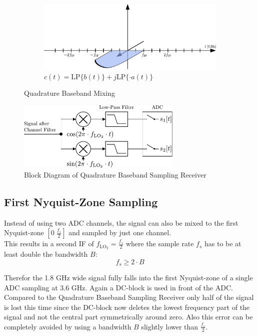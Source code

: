 \begin{figure}[h!]
\begin{subfigure}{0.45\textwidth}
    \centering
    \includegraphics[width=\textwidth]{figures/rx_adc_1_freq_c}
    \caption{$c(t) = \text{LP}\{b(t)\} + j \text{LP}\{\cdot a(t)\}$}
    \label{fig:rx_adc_1_freq_c}
  \end{subfigure}
  \caption{Quadrature Baseband Mixing}
  \label{fig:rx_adc_1_freq}
\end{figure}

\begin{figure}[h!]
  \centering
  \includegraphics[width=0.7\textwidth]{figures/rx_adc_1_bd}
  \caption{Block Diagram of Quadrature Baseband Sampling Receiver}
  \label{fig:rx_adc_1_bd}
\end{figure}

\subsection{First Nyquist-Zone Sampling}
\label{sec:rx_adc_0}
Instead of using two \gls{ADC} channels, the signal can also be mixed
to the first Nyquist-zone $[0 \; \frac{f_s}{2}]$ and sampled by just one
channel. \\

This results in a second \gls{IF} of $f_{\text{LO}_2} = \frac{f_s}{2}$ where
the sample rate $f_s$ has to be at least double the bandwidth $B$:
\[f_s \geq 2 \cdot B\]

Therefor the 1.8 GHz wide signal fully falls into the first Nyquist-zone of
a single \gls{ADC} sampling at 3.6 GHz. Again a \gls{DC}-block
is used in front of the \gls{ADC}. Compared to the Quadrature Baseband
Sampling Receiver only half of the signal is lost this time since
the \gls{DC}-block now deletes the lowest frequency part of the signal
and not the central part symmetrically around zero. Also this error
can be completely avoided by using a bandwidth $B$ slightly lower than
$\frac{f_s}{2}$. \\

